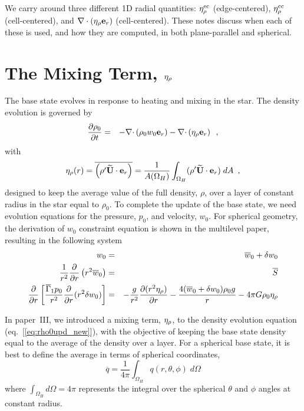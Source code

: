 We carry around three different 1D radial quantities: $\eta_{\rho}^{\rm ec}$
(edge-centered), $\eta_{\rho}^{\rm cc}$ (cell-centered), and $\nabla\cdot(\eta_{\rho}{\bf e}_r)$
(cell-centered).  These notes discuss when each of these is used, and
how they are computed, in both plane-parallel and spherical.

\section{The Mixing Term, $\eta_{\rho}$}

The base state evolves in response to heating and mixing in the star.
The density evolution is governed by
\begin{eqnarray}
\frac{\partial \rho_0}{\partial t} &=& - 
 \mathbf{\nabla} \mathbf{\cdot} \left( \rho_0 w_0 \mathbf{e}_r \right)
- \mathbf{\nabla} \mathbf{\cdot} \left( \eta_{\rho} \mathbf{e}_r \right) \enskip ,
\label{eq:rho0upd_new}
\end{eqnarray}
with
\begin{equation}
\eta_{\rho}(r) = \overline{\left({\rho^{\prime}} \widetilde{{\bf U}} \cdot \mathbf{e}_r \right)} = \frac{1}{A(\Omega_H)} 
 \int_{\Omega_H}  ({\rho^{\prime}} \widetilde{{\bf U}} \cdot \mathbf{e}_r ) \; dA \enskip , \label{eq:eta}
\end{equation}
designed to keep the average value of the full density, $\rho$, over a
layer of constant radius in the star equal to $\rho_0$.  To complete
the update of the base state, we need evolution equations for the
pressure, $p_0$, and velocity, $w_0$.  For spherical geometry, the
derivation of $w_0$ constraint equation is shown in
the multilevel paper, resulting in the following system
\begin{eqnarray}
w_0 &=& \overline{w}_0 + \delta w_0 \\
\frac{1}{r^2} \frac{\partial}{\partial r} \left (r^2 \overline{w}_0 \right ) &=& \overline{S} \\
\frac{\partial}{\partial r} \left[ \frac{\overline{\Gamma}_1 p_0}{r^2} \frac{\partial}{\partial r} (r^2 \delta w_0) \right] &=& - \frac{g}{r^2} \frac{\partial (r^2 \eta_{\rho})}{\partial r} - \frac{4 (\overline{w}_0 + \delta w_0) \rho_0 g}{r} 
- 4 \pi G \rho_0 \eta_{\rho} \label{eq:dw0constraint}
\end{eqnarray}

In paper~III, we introduced a mixing term, $\eta_{\rho}$, to the density
evolution equation (eq.~[\ref{eq:rho0upd_new}]), with the objective of
keeping the base state density equal to the average of the density
over a layer.  For a spherical base state, it is best to define the 
average in terms of spherical coordinates,
\begin{equation}
\overline{q} = \frac{1}{4\pi} \int_{\Omega_H} q(r,\theta,\phi) \; d\Omega
\end{equation}
where $\int_{\Omega_H} d\Omega = 4\pi$ represents the integral over
the spherical $\theta$ and $\phi$ angles at constant radius.

